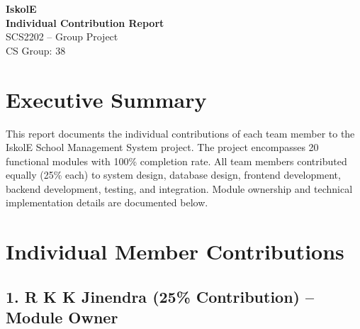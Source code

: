 \documentclass[11pt, a4paper]{article}
\begin{document}
\begin{center}
    \vspace*{0.5cm}
    {\LARGE\textbf{\color{themedarkblue}IskolE}}\\[0.2cm]
    {\large\textbf{\color{themeblue}Individual Contribution Report}}\\[0.8cm]
    {\normalsize SCS2202 – Group Project}\\[0.2cm]
    {\normalsize CS Group: 38}\\[1.5cm]
\end{center}
\section*{Executive Summary}

This report documents the individual contributions of each team member to the IskolE School Management System project. The project encompasses 20 functional modules with 100\% completion rate. All team members contributed equally (25\% each) to system design, database design, frontend development, backend development, testing, and integration. Module ownership and technical implementation details are documented below.

\vspace{0.2cm}

\section*{Individual Member Contributions}

\subsection*{1. R K K Jinendra (25\% Contribution) -- Module Owner}
\end{document}
